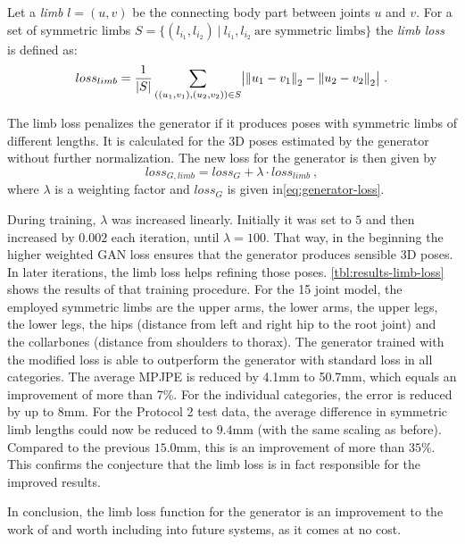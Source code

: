 Let a \emph{limb} $l = (u, v)$ be the connecting body part between joints $u$ and $v$.
For a set of symmetric limbs $S = \{(l_{i_1}, l_{i_2})~|~ l_{i_1}, l_{i_2}\ \text{are symmetric limbs} \}$ the \emph{limb loss} is defined as:
\begin{equation}
loss_{limb} = \frac{1}{|S|}\sum_{((u_1, v_1), (u_2, v_2)) \in S} \bigl\lvert \norm{u_1 - v_1}_2 - \norm{u_2 - v_2}_2 \bigr\rvert \ .
\end{equation}

The limb loss penalizes the generator if it produces poses with symmetric limbs of different lengths.
It is calculated for the 3D poses estimated by the generator without further normalization.
The new loss for the generator is then given by
\begin{equation}
	loss_{G, limb} = loss_G + \lambda \cdot loss_{limb} \ ,
\end{equation}
where $\lambda$ is a weighting factor and $loss_G$ is given in\autoref{eq:generator-loss}.



During training, $\lambda$ was increased linearly.
Initially it was set to $5$ and then increased by $0.002$ each iteration, until $\lambda = 100$.
That way, in the beginning the higher weighted GAN loss ensures that the generator produces sensible 3D poses. 
In later iterations, the limb loss helps refining those poses.
\autoref{tbl:results-limb-loss} shows the results of that training procedure.
For the 15 joint model, the employed symmetric limbs are the upper arms, the lower arms, the upper legs, the lower legs, the hips (distance from left and right hip to the root joint) and the collarbones (distance from shoulders to thorax). 
The generator trained with the modified loss is able to outperform the generator with standard loss in all categories.
The average MPJPE is reduced by 4.1mm to 50.7mm, which equals an improvement of more than 7\%.
For the individual categories, the error is reduced by up to 8mm.
For the Protocol 2 test data, the average difference in symmetric limb lengths could now be reduced to $9.4$mm (with the same scaling as before).
Compared to the previous $15.0$mm, this is an improvement of more than $35\%$.
This confirms the conjecture that the limb loss is in fact responsible for the improved results.

In conclusion, the limb loss function for the generator is an improvement to the work of \citet{drover18} and worth including into future systems, as it comes at no cost.


